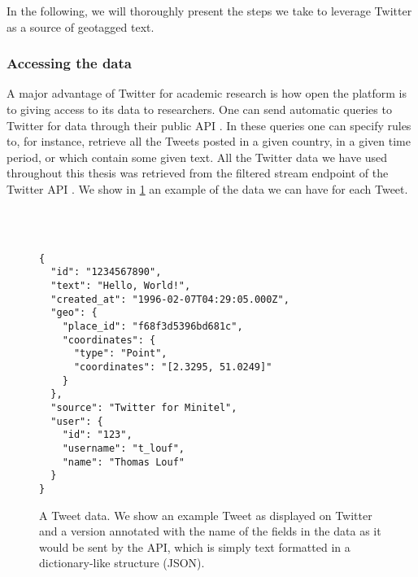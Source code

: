 \documentclass[../thesis.tex]{subfiles}
\begin{document}
In the following, we will thoroughly present the steps we take to leverage Twitter as a
source of geotagged text.


\subsubsection{Accessing the data}
A major advantage of Twitter for academic research is how open the platform is to giving
access to its data to researchers. One can send automatic queries to Twitter for data
through their public \ac{API} \cite{TwitterAPI}. In these queries one can specify rules
to, for instance, retrieve all the Tweets posted in a given country, in a given time
period, or which contain some given text. All the Twitter data we have used throughout
this thesis was retrieved from the filtered stream endpoint of the Twitter \ac{API}
\cite{TwitterAPIa}. We show in \cref{fig:tweet_data} an example of the data we can have
for each Tweet.

\captionsetup[subfigure]{position=top, labelfont=it,textfont=normalfont,singlelinecheck=off,justification=raggedright}
\begin{figure}
  \centering
  \\
  \\
  \begin{SubFloat}{\label{subfig:json}}
    \begin{minipage}[b]{0.95\linewidth}
        \begin{lstlisting}[frame=single,xleftmargin=5mm]
{
  "id": "1234567890",
  "text": "Hello, World!",
  "created_at": "1996-02-07T04:29:05.000Z",
  "geo": {
    "place_id": "f68f3d5396bd681c",
    "coordinates": {
      "type": "Point",
      "coordinates": "[2.3295, 51.0249]"
    }
  },
  "source": "Twitter for Minitel",
  "user": {
    "id": "123",
    "username": "t_louf",
    "name": "Thomas Louf"
  }
}
      \end{lstlisting}
    \end{minipage}
  \end{SubFloat}
  \caption[]{A Tweet data. We show  an example Tweet as displayed
  on Twitter and  a version annotated with the name of the
  fields in  the data as it would be sent by the \ac{API}, which is
  simply text formatted in a dictionary-like structure (JSON).}
  \label{fig:tweet_data}
\end{figure}
\end{document}
